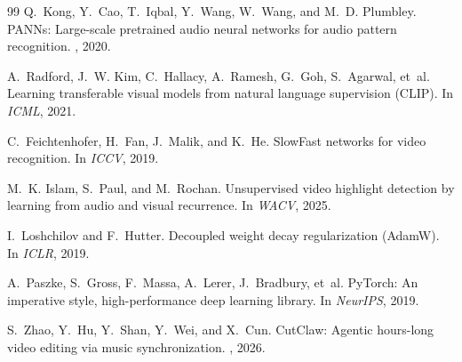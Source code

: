 \documentclass[10pt,twocolumn,letterpaper]{article}
\begin{document}
{\begin{thebibliography}{99}
Q.~Kong, Y.~Cao, T.~Iqbal, Y.~Wang, W.~Wang, and M.~D. Plumbley.
\newblock PANNs: Large-scale pretrained audio neural networks for audio pattern recognition.
, 2020.

A.~Radford, J.~W. Kim, C.~Hallacy, A.~Ramesh, G.~Goh, S.~Agarwal, et~al.
\newblock Learning transferable visual models from natural language supervision (CLIP).
\newblock In {\em ICML}, 2021.

C.~Feichtenhofer, H.~Fan, J.~Malik, and K.~He.
\newblock SlowFast networks for video recognition.
\newblock In {\em ICCV}, 2019.

M.~K. Islam, S.~Paul, and M.~Rochan.
\newblock Unsupervised video highlight detection by learning from audio and visual recurrence.
\newblock In {\em WACV}, 2025.

I.~Loshchilov and F.~Hutter.
\newblock Decoupled weight decay regularization (AdamW).
\newblock In {\em ICLR}, 2019.

A.~Paszke, S.~Gross, F.~Massa, A.~Lerer, J.~Bradbury, et~al.
\newblock PyTorch: An imperative style, high-performance deep learning library.
\newblock In {\em NeurIPS}, 2019.

S.~Zhao, Y.~Hu, Y.~Shan, Y.~Wei, and X.~Cun.
\newblock CutClaw: Agentic hours-long video editing via music synchronization.
, 2026.

\end{thebibliography}
}
\end{document}
